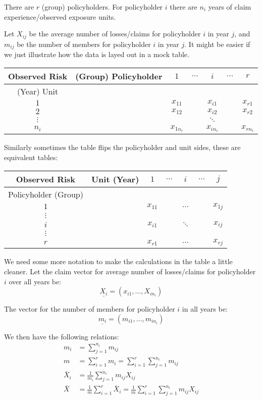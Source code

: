 \documentclass[english,12pt]{article}
\theoremstyle{plain}
\theoremstyle{definition}
\theoremstyle{definition} %
\begin{document}
There are $r$ (group) policyholders.  For policyholder $i$ there are $n_i$ years of claim experience/observed exposure units.

Let $X_{ij}$ be the average number of losses/claims for policyholder $i$ in year $j$, and $m_{ij}$ be the number of members for policyholder $i$ in year $j$.  It might be easier if we just illustrate how the data is layed out in a mock table.

\begin{center}
\begin{tabular}{c|c|ccccc}
Observed Risk & (Group) Policyholder & $1$ & $\ldots$ & $i$ & $\ldots$ & $r$\\
\hline
(Year) Unit &  & & & & &\\
$1$ & & $x_{11}$ & & $x_{i1}$ & & $x_{r1}$\\
$2$ & & $x_{12}$ & & $x_{i2}$ & & $x_{r2}$\\
$\vdots$ & & &  & $\ddots$ & &\\ 
$n_i$ & & $x_{1n_i}$ & & $x_{in_i}$ & & $x_{rn_i}$
\end{tabular}
\end{center}

Similarly sometimes the table flips the policyholder and unit sides, these are equivalent tables:

\begin{center}
\begin{tabular}{c|c|ccccc}
Observed Risk & Unit (Year) & $1$ & $\ldots$ & $i$ & $\ldots$ & $j$\\
\hline
Policyholder (Group) & & & & & &\\
$1$ & & $x_{11}$ & & $\ldots$ & & $x_{1j}$\\
$\vdots$ & & & & & &\\
$i$ & & $x_{i1}$ & & $\ddots$ & & $x_{ij}$\\ 
$\vdots$ & & & & & &\\
$r$ & & $x_{r1}$ & & $\ldots$ & & $x_{rj}$
\end{tabular}
\end{center}

We need some more notation to make the calculations in the table a little cleaner.  Let the claim vector for average number of losses/claims for policyholder $i$ over all years be:
\[\underline{X_i}=(x_{i1},\ldots,X_{in_i})\]

The vector for the number of members for policyholder $i$ in all years be:
\[\underline{m_i}=(m_{i1},\ldots,m_{in_i})\]

We then have the following relations:
\begin{align*}
m_i&=\sum_{j=1}^{n_i}m_{ij}\\
m&=\sum_{i=1}^rm_i
=\sum_{i=1}^r\sum_{j=1}^{n_i}m_{ij}\\
\bar{X}_i&=\frac{1}{m_i}\sum_{j=1}^{n_i}m_{ij}X_{ij}\\
\bar{X}&=\frac{1}{m}\sum_{i=1}^r\bar{X}_i
=\frac{1}{m}\sum_{i=1}^r\sum_{j=1}^{n_i}m_{ij}X_{ij}
\end{align*}
\end{document}
